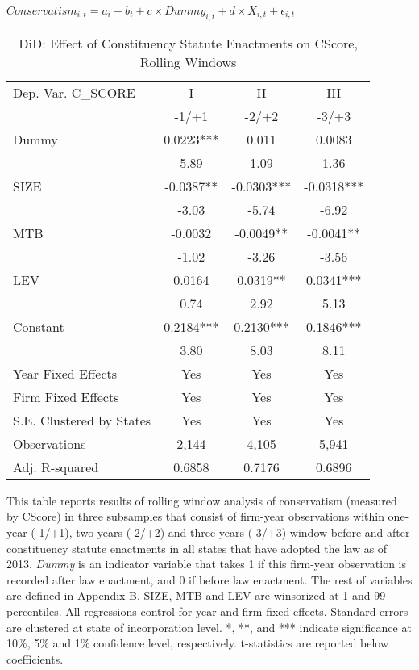 \begin{table}[H]
	\centering
	\caption{DiD: Effect of Constituency Statute Enactments on C\textunderscore Score, Rolling Windows}
	$Conservatism_{i,t}=a_i+b_t+c\times Dummy_{i,t}+d\times X_{i,t}+\epsilon_{i,t}$
	\begin{tabular}{lccc}
		\toprule
		\toprule
		Dep. Var. C\_SCORE & I & II & III \\
		\multicolumn{1}{r}{} & -1/+1 & -2/+2 & -3/+3 \\
		\midrule
		\rowcolor[rgb]{ .906,  .902,  .902} Dummy & 0.0223*** & 0.011 & 0.0083 \\
		\rowcolor[rgb]{ .906,  .902,  .902} & 5.89  & 1.09  & 1.36 \\
		SIZE  & -0.0387** & -0.0303***& -0.0318*** \\
		& -3.03 & -5.74 & -6.92 \\
		MTB   & -0.0032 & -0.0049** & -0.0041** \\
		& -1.02 & -3.26 & -3.56 \\
		LEV   & 0.0164 & 0.0319** & 0.0341*** \\
		& 0.74  & 2.92  & 5.13 \\
		Constant & 0.2184*** & 0.2130*** & 0.1846*** \\
		& 3.80  & 8.03  & 8.11 \\
		Year Fixed Effects & Yes & Yes & Yes \\
		Firm Fixed Effects & Yes & Yes & Yes \\
		S.E. Clustered by States & Yes & Yes & Yes \\
		Observations & 2,144 & 4,105 & 5,941 \\
		Adj. R-squared & 0.6858 & 0.7176 & 0.6896 \\
		\bottomrule
		\bottomrule
	\end{tabular}%
\end{table}%
\noindent This table reports results of rolling window analysis of conservatism (measured by C\textunderscore Score) in three subsamples that consist of firm-year observations within one-year (-1/+1), two-years (-2/+2) and three-years (-3/+3) window before and after constituency statute enactments in all states that have adopted the law as of 2013. \textit{Dummy} is an indicator variable that takes 1 if this firm-year observation is recorded after law enactment, and 0 if before law enactment. The rest of variables are defined in Appendix B. SIZE, MTB and LEV are winsorized at 1 and 99 percentiles. All regressions control for year and firm fixed effects. Standard errors are clustered at state of incorporation level. *, **, and *** indicate significance at 10\%, 5\% and 1\% confidence level, respectively. t-statistics are reported below coefficients.